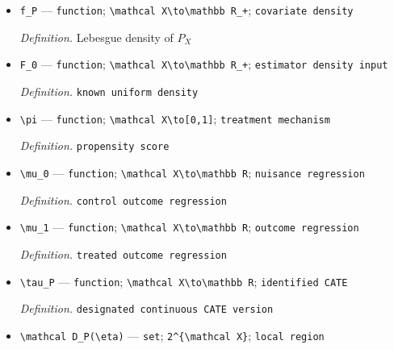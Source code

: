 \documentclass{article}
\begin{document}
\begin{itemize}
  \par\smallskip\noindent\emph{Definition.} \texttt{covariate marginal}
  \item \texttt{f\_\allowbreak{}P} --- \texttt{function}; \texttt{\textbackslash{}\allowbreak{}mathcal X\textbackslash{}\allowbreak{}to\textbackslash{}\allowbreak{}mathbb R\_\allowbreak{}+\allowbreak{}}; \texttt{covariate density}
  \par\smallskip\noindent\emph{Definition.} Lebesgue density of \(P_X\)
  \item \texttt{F\_\allowbreak{}0} --- \texttt{function}; \texttt{\textbackslash{}\allowbreak{}mathcal X\textbackslash{}\allowbreak{}to\textbackslash{}\allowbreak{}mathbb R\_\allowbreak{}+\allowbreak{}}; \texttt{estimator density input}
  \par\smallskip\noindent\emph{Definition.} \texttt{known uniform density}
  \item \texttt{\textbackslash{}\allowbreak{}pi} --- \texttt{function}; \texttt{\textbackslash{}\allowbreak{}mathcal X\textbackslash{}\allowbreak{}to[0,\allowbreak{}1]}; \texttt{treatment mechanism}
  \par\smallskip\noindent\emph{Definition.} \texttt{propensity score}
  \item \texttt{\textbackslash{}\allowbreak{}mu\_\allowbreak{}0} --- \texttt{function}; \texttt{\textbackslash{}\allowbreak{}mathcal X\textbackslash{}\allowbreak{}to\textbackslash{}\allowbreak{}mathbb R}; \texttt{nuisance regression}
  \par\smallskip\noindent\emph{Definition.} \texttt{control outcome regression}
  \item \texttt{\textbackslash{}\allowbreak{}mu\_\allowbreak{}1} --- \texttt{function}; \texttt{\textbackslash{}\allowbreak{}mathcal X\textbackslash{}\allowbreak{}to\textbackslash{}\allowbreak{}mathbb R}; \texttt{outcome regression}
  \par\smallskip\noindent\emph{Definition.} \texttt{treated outcome regression}
  \item \texttt{\textbackslash{}\allowbreak{}tau\_\allowbreak{}P} --- \texttt{function}; \texttt{\textbackslash{}\allowbreak{}mathcal X\textbackslash{}\allowbreak{}to\textbackslash{}\allowbreak{}mathbb R}; \texttt{identified CATE}
  \par\smallskip\noindent\emph{Definition.} \texttt{designated continuous CATE version}
  \item \texttt{\textbackslash{}\allowbreak{}mathcal D\_\allowbreak{}P(\textbackslash{}\allowbreak{}eta)} --- \texttt{set}; \texttt{2\textasciicircum{}\{\textbackslash{}\allowbreak{}mathcal X\}\allowbreak{}}; \texttt{local region}

\end{itemize}
\end{document}
